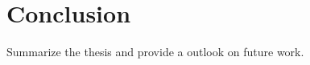 \chapter{Conclusion}\label{chap:conclusion}

Summarize the thesis and provide a outlook on future work.  
